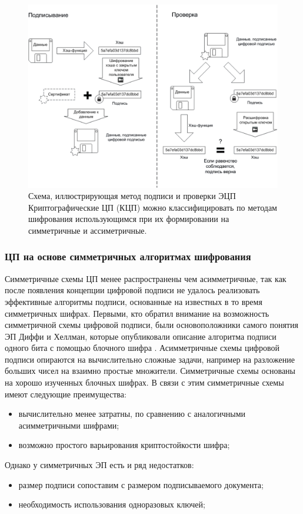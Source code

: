 \begin{figure}[ht]
\centering
\includegraphics[width=0.9\linewidth]{CryptoSchema}
\caption[Цикл криптографичкеской цифровой подписи]{Схема, иллюстрирующая метод подписи и проверки ЭЦП Криптографические ЦП (КЦП) можно классифицировать по методам шифрования использующимся при их формировании на симметричные и ассиметричные.}
\label{fig:CryptoSchema}
\end{figure}
\subsubsection{ЦП на основе симметричных алгоритмах шифрования}
\par Симметричные схемы ЦП менее распространены чем асимметричные, так как после появления концепции цифровой подписи не удалось реализовать эффективные алгоритмы подписи, основанные на известных в то время симметричных шифрах. Первыми, кто обратил внимание на возможность симметричной схемы цифровой подписи, были основоположники самого понятия ЭП Диффи и Хеллман, которые опубликовали описание алгоритма подписи одного бита с помощью блочного шифра \cite{diffie1976}. Асимметричные схемы цифровой подписи опираются на вычислительно сложные задачи, например на разложение больших чисел на взаимно простые множители. Симметричные схемы основаны на хорошо изученных блочных шифрах. В связи с этим симметричные схемы имеют следующие преимущества:
\begin{itemize}
\item вычислительно менее затратны, по сравнению с аналогичными асимметричными шифрами;
\item возможно простого варьирования криптостойкости шифра;
\end{itemize}
\par Однако у симметричных ЭП есть и ряд недостатков:
\begin{itemize}
\item размер подписи сопоставим с размером подписываемого документа;
\item необходимость использования одноразовых ключей;
\end{itemize}
